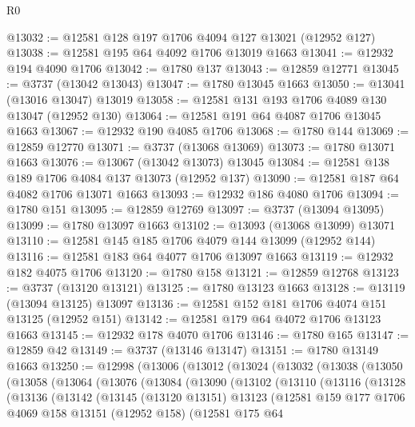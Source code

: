 \begin{lexlean}{R0}
\begin{coremodule}
@13032 := @12581 @128 @197 @1706 @4094 @127 @13021 (@12952 @127)
@13038 := @12581 @195 @64 @4092 @1706 @13019 @1663
@13041 := @12932 @194 @4090 @1706
@13042 := @1780 @137
@13043 := @12859 @12771
@13045 := @3737 (@13042 @13043)
@13047 := @1780 @13045 @1663
@13050 := @13041 (@13016 @13047) @13019
@13058 := @12581 @131 @193 @1706 @4089 @130 @13047 (@12952 @130)
@13064 := @12581 @191 @64 @4087 @1706 @13045 @1663
@13067 := @12932 @190 @4085 @1706
@13068 := @1780 @144
@13069 := @12859 @12770
@13071 := @3737 (@13068 @13069)
@13073 := @1780 @13071 @1663
@13076 := @13067 (@13042 @13073) @13045
@13084 := @12581 @138 @189 @1706 @4084 @137 @13073 (@12952 @137)
@13090 := @12581 @187 @64 @4082 @1706 @13071 @1663
@13093 := @12932 @186 @4080 @1706
@13094 := @1780 @151
@13095 := @12859 @12769
@13097 := @3737 (@13094 @13095)
@13099 := @1780 @13097 @1663
@13102 := @13093 (@13068 @13099) @13071
@13110 := @12581 @145 @185 @1706 @4079 @144 @13099 (@12952 @144)
@13116 := @12581 @183 @64 @4077 @1706 @13097 @1663
@13119 := @12932 @182 @4075 @1706
@13120 := @1780 @158
@13121 := @12859 @12768
@13123 := @3737 (@13120 @13121)
@13125 := @1780 @13123 @1663
@13128 := @13119 (@13094 @13125) @13097
@13136 := @12581 @152 @181 @1706 @4074 @151 @13125 (@12952 @151)
@13142 := @12581 @179 @64 @4072 @1706 @13123 @1663
@13145 := @12932 @178 @4070 @1706
@13146 := @1780 @165
@13147 := @12859 @42
@13149 := @3737 (@13146 @13147)
@13151 := @1780 @13149 @1663
@13250 := @12998
    (@13006
      (@13012
        (@13024
          (@13032
            (@13038
              (@13050
                (@13058
                  (@13064
                    (@13076
                      (@13084
                        (@13090
                          (@13102
                            (@13110
                              (@13116
                                (@13128
                                  (@13136
                                    (@13142
                                      (@13145
                                        (@13120 @13151)
                                        @13123
                                        (@12581
                                          @159
                                          @177
                                          @1706
                                          @4069
                                          @158
                                          @13151
                                          (@12952 @158)
                                          (@12581
                                            @175
                                            @64

\end{coremodule}
\end{lexlean}
